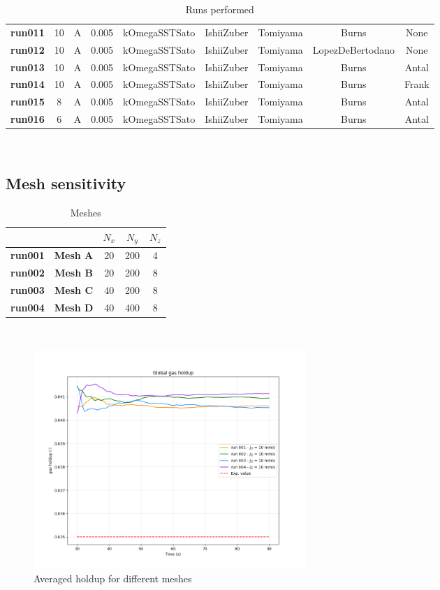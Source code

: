 \documentclass[11pt,a4paper]{article}
\begin{document}
\begin{table}
\begin{tabular}{|p{3em} c c c c c c c c|}
    \textbf{run011} & 10 & A & 0.005  & kOmegaSSTSato   & IshiiZuber & Tomiyama & Burns & None \T\B \\
    \textbf{run012} & 10 & A & 0.005  & kOmegaSSTSato   & IshiiZuber & Tomiyama & LopezDeBertodano & None \T\B \\
    \textbf{run013} & 10 & A & 0.005  & kOmegaSSTSato   & IshiiZuber & Tomiyama & Burns & Antal \T\B \\
    \textbf{run014} & 10 & A & 0.005  & kOmegaSSTSato   & IshiiZuber & Tomiyama & Burns & Frank \T\B \\
    \textbf{run015} & 8  & A & 0.005  & kOmegaSSTSato   & IshiiZuber & Tomiyama & Burns & Antal \T\B \\
    \textbf{run016} & 6  & A & 0.005  & kOmegaSSTSato   & IshiiZuber & Tomiyama & Burns & Antal \T\B \\
    \hline
    \end{tabular}
    \\[10pt]
    \caption{Runs performed}
    \label{table:example}
\end{table}

\subsection{Mesh sensitivity}
\label{sub:mesh_sensitivity}

\begin{table}[H]
    \centering 
    \begin{tabular}{|p{5em} c c c c |}
    \hline
    \rowcolor{bluePoli!40}
    & & \textbf{$N_x$} & \textbf{$N_y$} & \textbf{$N_z$} \T\B \\
    \hline \hline
    \textbf{run001} & \textbf{Mesh A} & 20 & 200 & 4 \T\B \\
    \textbf{run002} &\textbf{Mesh B} & 20 & 200 & 8 \T\B \\
    \textbf{run003} &\textbf{Mesh C} & 40 & 200 & 8 \T\B \\
    \textbf{run004} &\textbf{Mesh D} & 40 & 400 & 8 \T\B \\
    \hline
    \end{tabular}
    \\[10pt]
    \caption{Meshes}
    \label{table:meshes}
\end{table}

\begin{figure}[H]
    \centering
    \includegraphics[width=0.5\textwidth]{Images/graphs/mesh/holdUp10.png}
    \caption{Averaged holdup for different meshes}
    \label{fig:holdup_mesh}
\end{figure}
\end{document}
